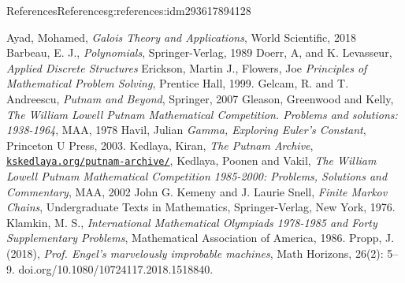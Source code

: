 \documentclass[twoside,10pt,]{book}
\numberwithin{equation}{section}
\begin{document}
\begin{references-chapter-numberless}{References}{}{References}{}{}{g:references:idm293617894128}
\begin{referencelist}
\label{x:biblio:biblio-ayad-2018}{}\hypertarget{x:biblio:biblio-ayad-2018}{}Ayad, Mohamed, \textit{Galois Theory and Applications}, World Scientific, 2018
\label{x:biblio:biblio-barbeau-1989}{}\hypertarget{x:biblio:biblio-barbeau-1989}{}Barbeau, E. J., \textit{Polynomials}, Springer-Verlag, 1989
\label{x:biblio:biblio-doerr-2019}{}\hypertarget{x:biblio:biblio-doerr-2019}{}Doerr, A, and K. Levasseur, \textit{Applied Discrete Structures}
\label{x:biblio:biblio-allenby-1983}{}\hypertarget{x:biblio:biblio-allenby-1983}{}Erickson, Martin J., Flowers, Joe \textit{Principles of Mathematical Problem Solving}, Prentice Hall, 1999.
\label{x:biblio:biblio-titu-2007}{}\hypertarget{x:biblio:biblio-titu-2007}{}Gelcam, R. and  T. Andreescu, \textit{Putnam and Beyond}, Springer, 2007
\label{x:biblio:biblio-putnam-1}{}\hypertarget{x:biblio:biblio-putnam-1}{}Gleason, Greenwood and Kelly, \textit{The William Lowell Putnam Mathematical Competition. Problems and solutions: 1938-1964}, MAA, 1978
\label{x:biblio:biblio-havil-2003}{}\hypertarget{x:biblio:biblio-havil-2003}{}Havil, Julian \textit{Gamma, Exploring Euler's Constant}, Princeton U Press, 2003.
\label{x:biblio:biblio-putnam-archive}{}\hypertarget{x:biblio:biblio-putnam-archive}{}Kedlaya, Kiran, \textit{The Putnam Archive}, \href{https://kskedlaya.org/putnam-archive/}{\nolinkurl{kskedlaya.org/putnam-archive/}},
\label{x:biblio:biblio-putnam-3}{}\hypertarget{x:biblio:biblio-putnam-3}{}Kedlaya, Poonen and Vakil, \textit{The William Lowell Putnam Mathematical Competition 1985-2000: Problems, Solutions and Commentary}, MAA, 2002
\label{x:biblio:biblio-kemeny}{}\hypertarget{x:biblio:biblio-kemeny}{}John G. Kemeny and J. Laurie Snell, \textit{Finite Markov Chains}, Undergraduate Texts in Mathematics, Springer-Verlag, New York, 1976.
\label{x:biblio:biblio-klamkin-1986}{}\hypertarget{x:biblio:biblio-klamkin-1986}{}Klamkin, M. S., \textit{International Mathematical Olympiads 1978-1985 and Forty Supplementary Problems}, Mathematical Association of America, 1986.
\label{x:biblio:biblio-propp}{}\hypertarget{x:biblio:biblio-propp}{}Propp, J. (2018), \textit{Prof.  Engel’s  marvelously  improbable  machines}, Math Horizons, 26(2):  5–9. doi.org\slash{}10.1080\slash{}10724117.2018.1518840.

\end{referencelist}
\end{references-chapter-numberless}
\end{document}
